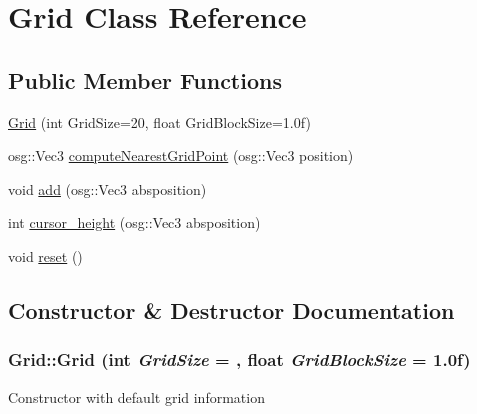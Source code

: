 \hypertarget{class_grid}{
\section{Grid Class Reference}
\label{class_grid}
}
\subsection*{Public Member Functions}
\begin{DoxyCompactItemize}
\item 
\hyperlink{class_grid_abb5708a164dcc1154f1bcee5cdd21897}{Grid} (int GridSize=20, float GridBlockSize=1.0f)
\item 
osg::Vec3 \hyperlink{class_grid_a0a159364e4833a4e655017e77ed30ebf}{computeNearestGridPoint} (osg::Vec3 position)
\item 
void \hyperlink{class_grid_ae92442413550b0859309d434508dc506}{add} (osg::Vec3 absposition)
\item 
int \hyperlink{class_grid_ab8a99641727faeb81c162f06ac56a915}{cursor\_\-height} (osg::Vec3 absposition)
\item 
void \hyperlink{class_grid_a153095310e11b93d349d12f218b5e73e}{reset} ()
\end{DoxyCompactItemize}


\subsection{Constructor \& Destructor Documentation}
\hypertarget{class_grid_abb5708a164dcc1154f1bcee5cdd21897}{
\subsubsection[{Grid}]{\setlength{\rightskip}{0pt plus 5cm}Grid::Grid (int {\em GridSize} = {}, \/  float {\em GridBlockSize} = {\ttfamily 1.0f})}}
\label{class_grid_abb5708a164dcc1154f1bcee5cdd21897}
Constructor with default grid information 

